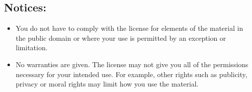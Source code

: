 \documentclass[letterpaper,twoside]{article}
\begin{document}
\subsection{Notices:}
\begin{itemize}
\item{You do not have to comply with the license for elements of the
  material in the public domain or where your use is permitted by an
  exception or limitation.}
\item{No warranties are given.  The license may not give you all of the
  permissions necessary for your intended use.  For example, other rights
  such as publicity, privacy or moral rights may limit how you use the
  material.}
\end{itemize}

\newpage


\end{document}
